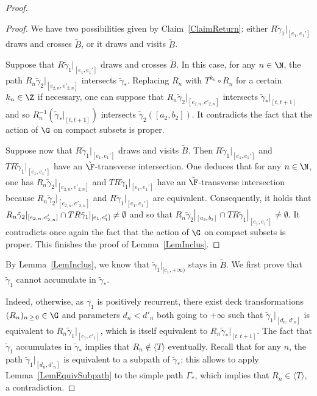 \begin{proof}
\begin{proof}
We have two possibilities given by Claim~\ref{ClaimReturn}: either $R\tilde\gamma_1|_{[e_1,e_1']}$ draws and crosses $\tilde B$, or it draws and visits $\tilde B$.

Suppose that $R\tilde\gamma_1|_{[e_1,e_1']}$ draws and crosses $\tilde B$. In this case, for any $n\in\N$, the path $R_n \tilde\gamma_2|_{[e_{2,n},e'_{2,n}]}$ intersects $\tilde\gamma_*$. Replacing $R_n$ with $T^{k_n}\circ R_n$ for a certain $k_n\in\Z$ if necessary, one can suppose that $R_n \tilde\gamma_2|_{[e_{2,n},e'_{2,n}]}$ intersects $\tilde\gamma_*|_{[t,t+1]}$ and so $R_n^{-1}(\tilde\gamma_*|_{[t,t+1]})$ intersects $\tilde \gamma_2([a_2,b_2])$. It contradicts the fact that the action of $\G$ on compact subsets is proper.

Suppose now that $R\tilde\gamma_1|_{[e_1,e_1']}$ draws and visits $\tilde B$. Then $R\tilde\gamma_1|_{[e_1,e_1']}$ and $TR\tilde\gamma_1|_{[e_1,e_1']}$ have an $\tilde{\F}$-transverse intersection. One deduces that for any $n\in\N$, one has $R_n \tilde\gamma_2|_{[e_{2,n},e'_{2,n}]}$ and $TR\tilde\gamma_1|_{[e_1,e_1']}$ have an $\tilde{\F}$-transverse intersection because $R_n \tilde\gamma_2|_{[e_{2,n},e'_{2,n}]}$ and $R\tilde\gamma_1|_{[e_1,e_1']}$ are equivalent. Consequently, it holds that $R_n \tilde\gamma_2|_{[e_{2,n},e'_{2,n}]}\cap TR\tilde\gamma_1|_{[e_1,e_1']}\linebreak\not =\emptyset$ and so that $R_n \tilde\gamma_2|_{[a_2,b_2]}\cap TR\tilde\gamma_1|_{[e_1,e_1']}\not =\emptyset$. It contradicts once again the fact that the action of $\G$ on compact subsets is proper. This finishes the proof of Lemma~\ref{LemInclus}.
\end{proof}


By Lemma~\ref{LemInclus}, we know that $\tilde\gamma_1|_{[c_1,+\infty)}$ stays in $\tilde B$. We first prove that $\tilde\gamma_1$ cannot accumulate in $\tilde\gamma_*$.

Indeed, otherwise, as $\gamma_1$ is positively recurrent, there exist deck transformations $(R_n)_{n\,\ge\,0}\in \G$ and parameters $d_n<d'_n$ both going to $+\infty$ such that $\tilde\gamma_1|_{[d_n,d'_n]}$ is equivalent to $R_n\tilde\gamma_1|_{[c_1,c'_1]}$, which is itself equivalent to $R_n\tilde\gamma_*|_{[t,t+1]}$. The fact that $\tilde\gamma_1$ accumulates in $\tilde\gamma_*$ implies that $R_n\notin\langle T \rangle$ eventually. Recall that for any $n$, the path $\tilde\gamma_1|_{[d_n,d'_n]}$ is equivalent to a subpath of $\tilde\gamma_*$; this allows to apply Lemma~\ref{LemEquivSubpath} to the simple path $\Gamma_*$, which implies that $R_n\in\langle T \rangle$, a contradiction.


\end{proof}
